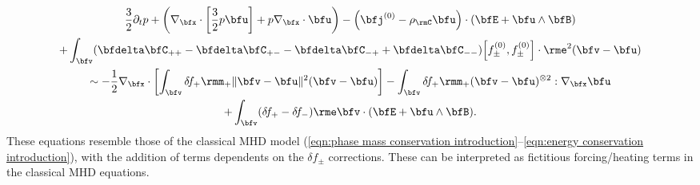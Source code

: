     \begin{multline}
        \frac{3}{2}\partial_{t}p + \left(\nabla_{\bfx}\cdot\left[\frac{3}{2}p\bfu\right] + p\nabla_{\bfx}\cdot\bfu\right) - \left(\bfj^{(0)} - \rho_{\rmC}\bfu\right)\cdot(\bfE + \bfu\wedge\bfB)  \\
        + \int_{\bfv}(\bfdelta\bfC_{++} - \bfdelta\bfC_{+-} - \bfdelta\bfC_{-+} + \bfdelta\bfC_{--})\!\left[f_{\pm}^{(0)}, f_{\pm}^{(0)}\right]\cdot\rme^{2}(\bfv - \bfu)  \\
        \sim  - \frac{1}{2}\nabla_{\bfx}\cdot\left[\int_{\bfv}\delta\! f_{+}\rmm_{+}\|\bfv - \bfu\|^{2}(\bfv - \bfu)\right] - \int_{\bfv}\delta\! f_{+}\rmm_{+}(\bfv - \bfu)^{\otimes 2}:\nabla_{\bfx}\bfu  \\
        + \int_{\bfv}(\delta\! f_{+} - \delta\! f_{-})\rme\bfv\cdot(\bfE + \bfu\wedge\bfB).
    \end{multline}
    These equations resemble those of the classical MHD model (\ref{eqn:phase mass conservation introduction}--\ref{eqn:energy conservation introduction}), with the addition of terms dependents on the $\delta\! f_{\pm}$ corrections. These can be interpreted as fictitious forcing/heating terms in the classical MHD equations.


